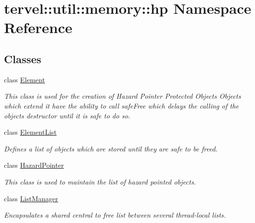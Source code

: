 \hypertarget{namespacetervel_1_1util_1_1memory_1_1hp}{}\section{tervel\+:\+:util\+:\+:memory\+:\+:hp Namespace Reference}
\label{namespacetervel_1_1util_1_1memory_1_1hp}
\subsection*{Classes}
\begin{DoxyCompactItemize}
\item 
class \hyperlink{classtervel_1_1util_1_1memory_1_1hp_1_1_element}{Element}
\begin{DoxyCompactList}\small\item\em This class is used for the creation of Hazard Pointer Protected Objects Objects which extend it have the ability to call safe\+Free which delays the calling of the objects destructor until it is safe to do so. \end{DoxyCompactList}\item 
class \hyperlink{classtervel_1_1util_1_1memory_1_1hp_1_1_element_list}{Element\+List}
\begin{DoxyCompactList}\small\item\em Defines a list of objects which are stored until they are safe to be freed. \end{DoxyCompactList}\item 
class \hyperlink{classtervel_1_1util_1_1memory_1_1hp_1_1_hazard_pointer}{Hazard\+Pointer}
\begin{DoxyCompactList}\small\item\em This class is used to maintain the list of hazard pointed objects. \end{DoxyCompactList}\item 
class \hyperlink{classtervel_1_1util_1_1memory_1_1hp_1_1_list_manager}{List\+Manager}
\begin{DoxyCompactList}\small\item\em Encapsulates a shared central \textquotesingle{}to free list\textquotesingle{} between several thread-\/local lists. \end{DoxyCompactList}\end{DoxyCompactItemize}
